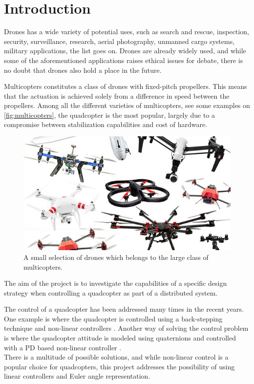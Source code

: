 \chapter{Introduction}
Drones has a wide variety of potential uses, such as search and rescue, inspection, security, surveillance, research, aerial photography, unmanned cargo systems, military applications, the list goes on. Drones are already widely used, and while some of the aforementioned applications raises ethical issues for debate, there is no doubt that drones also hold a place in the future.

Multicopters constitutes a class of drones with fixed-pitch propellers. This means that the actuation is achieved solely from a difference in speed between the propellers. Among all the different varieties of multicopters, see some examples on \autoref{fig:multicopters}, the quadcopter is the most popular, largely due to a compromise between stabilization capabilities and cost of hardware. \cite{TypesOfMulticopter}

\begin{figure}[H]
  \centering
  \includegraphics[width=.6\linewidth]{figures/multicopters}
  \caption{A small selection of drones which belongs to the large class of multicopters. \cite{multiCopterPhoto}}
  \label{fig:multicopters}
\end{figure}

The aim of the project is to investigate the capabilities of a specific design strategy when controlling a quadcopter as part of a distributed system.

The control of a quadcopter has been addressed many times in the recent years. One example is where the quadcopter is controlled using a back-stepping technique and non-linear controllers \cite{backstepping}. Another way of solving the control problem is where the quadcopter attitude is modeled using quaternions and controlled with a PD based non-linear controller \cite{quaternionsPD}.\\
There is a multitude of possible solutions, and while non-linear control is a popular choice for quadcopters, this project addresses the possibility of using linear controllers and Euler angle representation.

